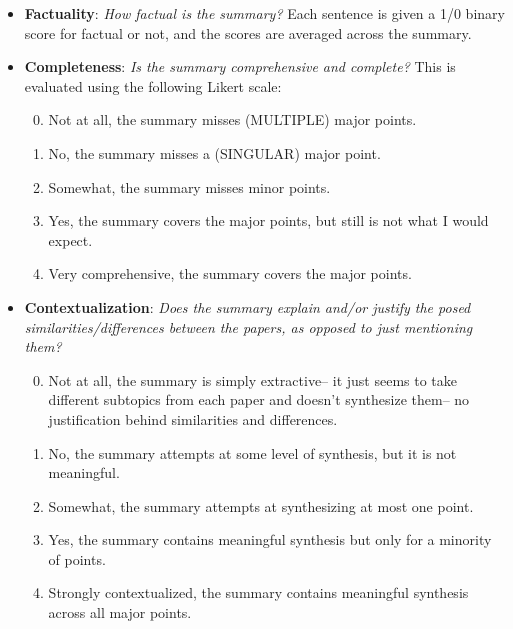 \begin{itemize}
    \item \textbf{Factuality}: \textit{How factual is the summary?} Each sentence is given a 1/0 binary score for factual or not, and the scores are averaged across the summary.
    \item \textbf{Completeness}: \textit{Is the summary comprehensive and complete?} This is evaluated using the following Likert scale:
    \begin{enumerate}
        \setcounter{enumi}{-1}
        \item Not at all, the summary misses (MULTIPLE) major points.
        \item No, the summary misses a (SINGULAR) major point.
        \item Somewhat, the summary misses minor points.
        \item Yes, the summary covers the major points, but still is not what I would expect.
        \item Very comprehensive, the summary covers the major points.
    \end{enumerate}
    \item \textbf{Contextualization}: 
    \textit{Does the summary explain and/or justify the posed similarities/differences between the papers, as opposed to just mentioning them?}
    \begin{enumerate}
        \setcounter{enumi}{-1}
        \item Not at all, the summary is simply extractive-- it just seems to take different subtopics from each paper and doesn’t synthesize them– no justification behind similarities and differences.
        \item No, the summary attempts at some level of synthesis, but it is not meaningful.
        \item Somewhat, the summary attempts at synthesizing at most one point.
        \item Yes, the summary contains meaningful synthesis but only for a minority of points.
        \item  Strongly contextualized, the summary contains meaningful synthesis across all major points.
    \end{enumerate}
\end{itemize}

